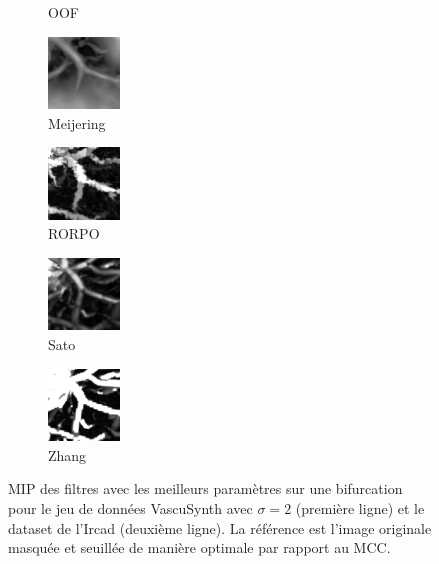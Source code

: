 \begin{figure}[H]
\begin{subfigure}[t]{0.25\textwidth}
        \caption{OOF}
      \end{subfigure}
      \begin{subfigure}[t]{0.25\textwidth}
        \includegraphics[clip = true, trim  = 0 50 0 80, width=19.0mm]{Images/Ircad_k_Meijering.png}
        \caption{Meijering}
      \end{subfigure}
      \begin{subfigure}[t]{0.25\textwidth}
        \includegraphics[clip = true, trim  = 0 50 0 80, width=19.0mm]{Images/Ircad_k_RORPO.png}
        \caption{RORPO}
      \end{subfigure}
      \begin{subfigure}[t]{0.25\textwidth}
        \includegraphics[clip = true, trim  = 0 50 0 80, width=19.0mm]{Images/Ircad_k_Sato.png}
        \caption{Sato}
      \end{subfigure}
      \begin{subfigure}[t]{0.25\textwidth}
        \includegraphics[clip = true, trim  = 0 50 0 80, width=19.0mm]{Images/Ircad_k_Zhang.png}
        \caption{Zhang}
      \end{subfigure}

      \caption{MIP des filtres avec les meilleurs paramètres sur une bifurcation pour le jeu de données VascuSynth avec $\sigma=2$ (première ligne) et le dataset de l'Ircad (deuxième ligne). La référence est l'image originale masquée et seuillée de manière optimale par rapport au MCC.
      }
      \label{fig:bifurcation_Ircad}
  \end{figure}
  
